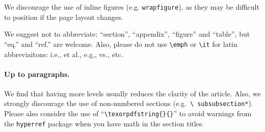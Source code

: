 We discourage the use of inline figures (e.g. \texttt{wrapfigure}), as they may be
difficult to position if the page layout changes.

We suggest not to abbreviate: ``section'', ``appendix'', ``figure''
and ``table'', but ``eq.'' and ``ref.'' are welcome. Also, please do
not use \texttt{\textbackslash emph} or \texttt{\textbackslash it} for
latin abbreviaitons: i.e., et al., e.g., vs., etc.


\paragraph{Up to paragraphs.} We find that having more levels usually
reduces the clarity of the article. Also, we strongly discourage the
use of non-numbered sections (e.g.~\texttt{\textbackslash
  subsubsection*}).  Please also consider the use of
``\texttt{\textbackslash texorpdfstring\{\}\{\}}'' to avoid warnings
from the \texttt{hyperref} package when you have math in the section titles.
